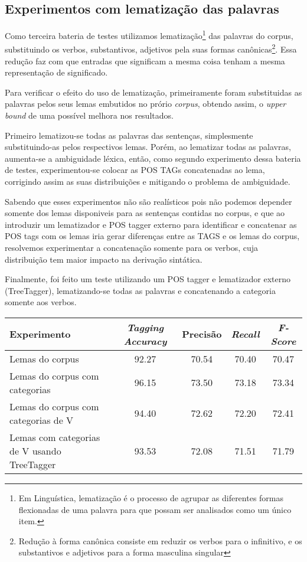 \subsection{Experimentos com lematização das palavras}
\label{sec:lematizacao}

Como terceira bateria de testes utilizamos lematização\footnote{Em Linguística, lematização é o processo de agrupar as diferentes formas flexionadas de uma palavra para que possam ser analisados como um único item.} das palavras do corpus, substituindo os verbos,
substantivos, adjetivos pela suas formas canônicas\footnote{Redução à forma canônica consiste em reduzir os verbos para o infinitivo, e os substantivos e adjetivos para a forma masculina singular}. Essa redução faz com que entradas que significam a mesma coisa tenham a mesma representação de significado.

Para verificar o efeito do uso de lematização, primeiramente foram substituidas as palavras pelos seus lemas embutidos no prório \emph{corpus}, obtendo assim, o \emph{upper bound} de uma possível melhora nos resultados.

Primeiro lematizou-se todas as palavras das sentenças, simplesmente substituindo-as pelos respectivos lemas. Porém, ao lematizar todas as palavras, aumenta-se a ambiguidade léxica, então, como segundo experimento dessa bateria de testes, experimentou-se colocar as POS TAGs concatenadas ao lema, corrigindo assim as suas distribuições e mitigando o problema de ambiguidade. 

Sabendo que esses experimentos não são realísticos pois não podemos depender somente dos lemas disponiveis para as sentenças contidas no corpus, e que ao introduzir um lematizador e POS tagger externo para identificar e concatenar as POS tags com os lemas iria gerar diferenças entre as TAGS e os lemas do corpus, resolvemos experimentar a concatenação somente para os verbos, cuja distribuição tem maior impacto na derivação sintática.

Finalmente, foi feito um teste utilizando um POS tagger e lematizador externo (TreeTagger), lematizando-se todas as palavras e concatenando a categoria somente aos verbos.


\begin{center}
   \footnotesize
	\begin{tabular}{|l|c|c|c|c|}
		\hline
		\textbf{Experimento} &  \textbf{\emph{Tagging Accuracy}} & \textbf{Precisão} & \textbf{\emph{Recall}} & \textbf{\emph{F-Score}} \\
		\hline
		Lemas do corpus & 92.27 & 70.54 & 70.40 & 70.47\\
		\hline		
		Lemas do corpus com categorias & 96.15 & 73.50 & 73.18 & 73.34\\
		\hline		
		Lemas do corpus com categorias de V & 94.40 & 72.62 & 72.20 & 72.41\\
		\hline		
		Lemas com categorias de V usando TreeTagger & 93.53 & 72.08 & 71.51 & 71.79\\
		\hline
	\end{tabular}
	\label{tab:terceiro_experimento}
\end{center}


